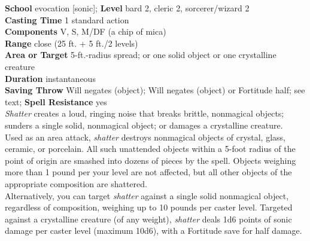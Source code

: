 \textbf{School} evocation [sonic]; \textbf{Level} bard 2, cleric 2, sorcerer/wizard 2\\
\textbf{Casting Time} 1 standard action\\
\textbf{Components} V, S, M/DF (a chip of mica)\\
\textbf{Range} close (25 ft. + 5 ft./2 levels)\\
\textbf{Area or Target} 5-ft.-radius spread; or one solid object or one crystalline creature\\
\textbf{Duration} instantaneous\\
\textbf{Saving Throw }Will negates (object); Will negates (object) or Fortitude half; see text; \textbf{Spell Resistance} yes\\
\textit{Shatter }creates a loud, ringing noise that breaks brittle, nonmagical objects; sunders a single solid, nonmagical object; or damages a crystalline creature.\\
Used as an area attack, \textit{shatter }destroys nonmagical objects of crystal, glass, ceramic, or porcelain. All such unattended objects within a 5-foot radius of the point of origin are smashed into dozens of pieces by the spell. Objects weighing more than 1 pound per your level are not affected, but all other objects of the appropriate composition are shattered.\\
Alternatively, you can target \textit{shatter }against a single solid nonmagical object, regardless of composition, weighing up to 10 pounds per caster level. Targeted against a crystalline creature (of any weight), \textit{shatter }deals 1d6 points of sonic damage per caster level (maximum 10d6), with a Fortitude save for half damage.\\

